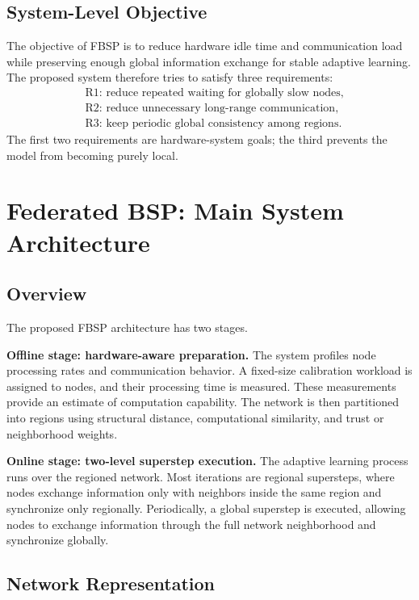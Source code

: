 ﻿\documentclass[10pt,journal]{IEEEtran}
\begin{document}
	\subsection{System-Level Objective}
	
	The objective of FBSP is to reduce hardware idle time and communication load while preserving enough global information exchange for stable adaptive learning. The proposed system therefore tries to satisfy three requirements:
	\[
	\begin{aligned}
		&\text{R1: reduce repeated waiting for globally slow nodes,}\\
		&\text{R2: reduce unnecessary long-range communication,}\\
		&\text{R3: keep periodic global consistency among regions.}
	\end{aligned}
	\]
	The first two requirements are hardware-system goals; the third prevents the model from becoming purely local.
	
	\section{Federated BSP: Main System Architecture}
	
	\subsection{Overview}
	
	The proposed FBSP architecture has two stages.
	
	\textbf{Offline stage: hardware-aware preparation.}
	The system profiles node processing rates and communication behavior. A fixed-size calibration workload is assigned to nodes, and their processing time is measured. These measurements provide an estimate of computation capability. The network is then partitioned into regions using structural distance, computational similarity, and trust or neighborhood weights.
	
	\textbf{Online stage: two-level superstep execution.}
	The adaptive learning process runs over the regioned network. Most iterations are regional supersteps, where nodes exchange information only with neighbors inside the same region and synchronize only regionally. Periodically, a global superstep is executed, allowing nodes to exchange information through the full network neighborhood and synchronize globally.
	
	\subsection{Network Representation}
	
\end{document}
